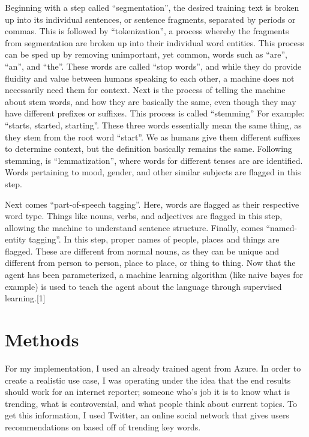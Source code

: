 \documentclass[]{article}
\begin{document}
    Beginning with a step called ``segmentation'', the desired training text is broken up into its individual sentences,
    or sentence fragments, separated by periods or commas. This is followed by ``tokenization'', a process whereby 
    the fragments from segmentation are broken up into their individual word entities. This process can be sped up
    by removing unimportant, yet common, words such as ``are'', ``an'', and ``the''. These words are called ``stop words'',
    and while they do provide fluidity and value between humans speaking to each other, a machine does not
    necessarily need them for context. Next is the process of telling the machine about stem words, and how they are 
    basically the same, even though they may have different prefixes or suffixes. This process is called ``stemming''
    For example: ``starts, started, starting''. These three words essentially mean the same thing, as they stem from 
    the root word ``start''. We as humans give them different suffixes to determine context, but the definition 
    basically remains the same. Following stemming, is ``lemmatization'', where words for different tenses are
    are identified. Words pertaining to mood, gender, and other similar subjects are flagged in this step.

    Next comes ``part-of-speech tagging''. Here, words are flagged as their respective word type. Things like nouns,
    verbs, and adjectives are flagged in this step, allowing the machine to understand sentence structure. Finally, 
    comes ``named-entity tagging''. In this step, proper names of people, places and things are flagged. These are 
    different from normal nouns, as they can be unique and different from person to person, place to place, or thing
    to thing. Now that the agent has been parameterized, a machine learning algorithm (like naive bayes for example)
    is used to teach the agent about the language through supervised learning.[1]

    \section{Methods}
    For my implementation, I used an already trained agent from Azure. In order to create a realistic use case,
    I was operating under the idea that the end results should work for an internet reporter; someone who's job
    it is to know what is trending, what is controversial, and what people think about current topics. 
    To get this information, I used Twitter, an online social network that gives users recommendations on based off
    of trending key words. 
    
\end{document}

